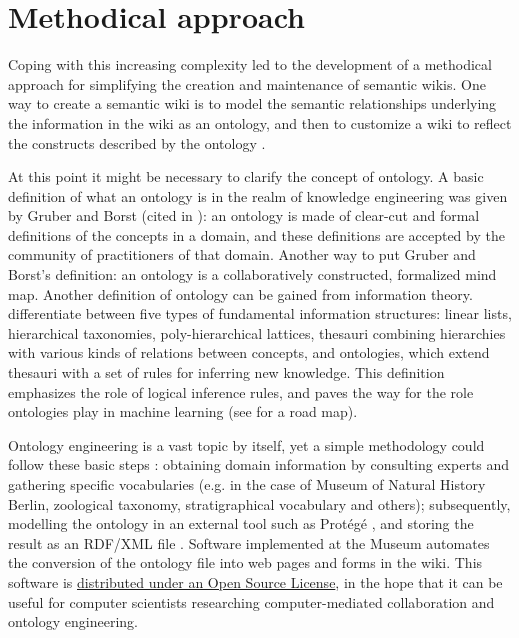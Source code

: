\documentclass[fleqn,10pt,lineno]{wlpeerj} %
\begin{document}
\section{Methodical approach}
Coping with this increasing complexity led to the development of a methodical approach for simplifying the creation and maintenance of semantic wikis. One way to create a semantic wiki is to model the semantic relationships underlying the information in the wiki as an ontology, and then to customize a wiki to reflect the constructs described by the ontology \citep{di2006automatic}. 

At this point it might be necessary to clarify the concept of ontology. A basic definition of what an ontology is in the realm of knowledge engineering was given by Gruber and Borst (cited in \citep{corcho2003methodologies}): an ontology is made of clear-cut and formal definitions of the concepts in a domain, and these definitions are accepted by the community of practitioners of that domain. Another way to put Gruber and Borst's definition: an ontology is a collaboratively constructed, formalized mind map.
Another definition of ontology can be gained from information theory. \citet{pieterse2014lists} differentiate between five types of fundamental information structures: linear lists, hierarchical taxonomies, poly-hierarchical lattices, thesauri combining hierarchies with various kinds of relations between concepts, and ontologies, which extend thesauri with a set of rules for inferring new knowledge. This definition emphasizes the role of logical inference rules, and paves the way for the role ontologies play in machine learning (see \citet{zhou2007ontology} for a road map).

Ontology engineering is a vast topic by itself, yet a simple methodology could follow these basic steps \citep{noy2001ontology}: obtaining domain information by consulting experts and gathering specific vocabularies (e.g. in the case of Museum of Natural History Berlin, zoological taxonomy, stratigraphical vocabulary and others); subsequently, modelling the ontology in an external tool such as Protégé \citep{musen2015protege}, and storing the result as an RDF/XML file \citep{rdfspec}. Software implemented at the Museum automates the conversion of the ontology file into web pages and forms in the wiki. This software is \href{https://github.com/MfN-Berlin/RDF-to-SemanticWiki}{distributed under an Open Source License}, in the hope that it can be useful for computer scientists researching computer-mediated collaboration and ontology engineering.
\end{document}
